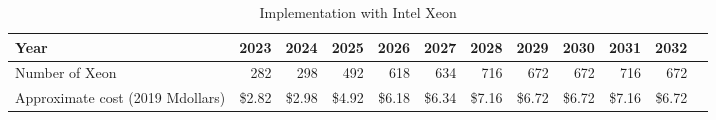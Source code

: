 \tiny \begin{longtable} { |p{}  |r  |r  |r  |r  |r  |r  |r  |r  |r  |r  |r |} 
\caption{Implementation with Intel Xeon \label{tab:opsXeon}}\\ 
\hline 
\textbf{Year}&\textbf{2023}&\textbf{2024}&\textbf{2025}&\textbf{2026}&\textbf{2027}&\textbf{2028}&\textbf{2029}&\textbf{2030}&\textbf{2031}&\textbf{2032} \\ \hline
{Number of Xeon}&{282}&{298}&{492}&{618}&{634}&{716}&{672}&{672}&{716}&{672} \\ \hline
{Approximate cost (2019 Mdollars)}&{\$2.82}&{\$2.98}&{\$4.92}&{\$6.18}&{\$6.34}&{\$7.16}&{\$6.72}&{\$6.72}&{\$7.16}&{\$6.72} \\ \hline
\end{longtable} \normalsize
